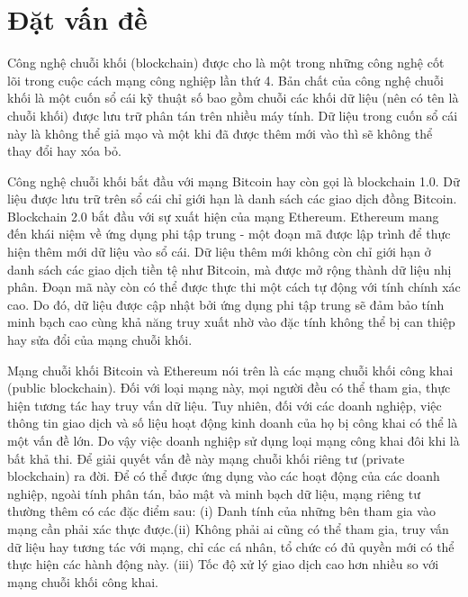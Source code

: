 \documentclass[../DoAn.tex]{subfiles}
\begin{document}
\section{Đặt vấn đề}
\label{section:1.1}
Công nghệ chuỗi khối (blockchain) được cho là một trong những công nghệ cốt lõi trong cuộc cách mạng công nghiệp lần thứ 4. Bản chất của công nghệ chuỗi khối là một cuốn sổ cái kỹ thuật số bao gồm chuỗi các khối dữ liệu (nên có tên là chuỗi khối) được lưu trữ phân tán trên nhiều máy tính. Dữ liệu trong cuốn sổ cái này là không thể giả mạo và một khi đã được thêm mới vào thì sẽ không thể thay đổi hay xóa bỏ. 

Công nghệ chuỗi khối bắt đầu với mạng Bitcoin \cite{bitcoin} hay còn gọi là blockchain 1.0. Dữ liệu được lưu trữ trên sổ cái chỉ giới hạn là danh sách các giao dịch đồng Bitcoin. Blockchain 2.0 bắt đầu với sự xuất hiện của mạng Ethereum. Ethereum \cite{ethereum} mang đến khái niệm về ứng dụng phi tập trung - một đoạn mã được lập trình để thực hiện thêm mới dữ liệu vào sổ cái. Dữ liệu thêm mới không còn chỉ giới hạn ở danh sách các giao dịch tiền tệ như Bitcoin, mà được mở rộng thành dữ liệu nhị phân. Đoạn mã này còn có thể được thực thi một cách tự động với tính chính xác cao. Do đó, dữ liệu được cập nhật bởi ứng dụng phi tập trung sẽ đảm bảo tính minh bạch cao cùng khả năng truy xuất nhờ vào đặc tính không thể bị can thiệp hay sửa đổi của mạng chuỗi khối.

Mạng chuỗi khối Bitcoin và Ethereum nói trên là các mạng chuỗi khối công khai (public blockchain). Đối với loại mạng này, mọi người đều có thể tham gia, thực hiện tương tác hay truy vấn dữ liệu. Tuy nhiên, đối với các doanh nghiệp, việc thông tin giao dịch và số liệu hoạt động kinh doanh của họ bị công khai có thể là một vấn đề lớn. Do vậy việc doanh nghiệp sử dụng loại mạng công khai đôi khi là bất khả thi. Để giải quyết vấn đề này mạng chuỗi khối riêng tư (private blockchain) ra đời. Để có thể được ứng dụng vào các hoạt động của các doanh nghiệp, ngoài tính phân tán, bảo mật và minh bạch dữ liệu, mạng riêng tư thường thêm có các đặc điểm sau: (i) Danh tính của những bên tham gia vào mạng cần phải xác thực được.(ii) Không phải ai cũng có thể tham gia, truy vấn dữ liệu hay tương tác với mạng, chỉ các cá nhân, tổ chức có đủ quyền mới có thể thực hiện các hành động này. (iii) Tốc độ xử lý giao dịch cao hơn nhiều so với mạng chuỗi khối công khai.
\end{document}
